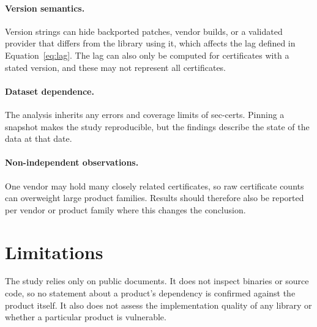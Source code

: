 \paragraph{Version semantics.} Version strings can hide backported patches, vendor builds,
or a validated provider that differs from the library using it, which affects the
lag defined in Equation~\ref{eq:lag}. The lag can also only be computed for certificates
with a stated version, and these may not represent all certificates.

\paragraph{Dataset dependence.} The analysis inherits any errors and coverage limits of
sec-certs. Pinning a snapshot makes the study reproducible, but the findings describe the
state of the data at that date.

\paragraph{Non-independent observations.} One vendor may hold many closely related
certificates, so raw certificate counts can overweight large product families. Results
should therefore also be reported per vendor or product family where this changes the
conclusion.

\section{Limitations}
\label{sec:limitations}

The study relies only on public documents. It does not inspect binaries or source code,
so no statement about a product's dependency is confirmed against the product itself.
It also does not assess the implementation quality of any library or whether a
particular product is vulnerable.
